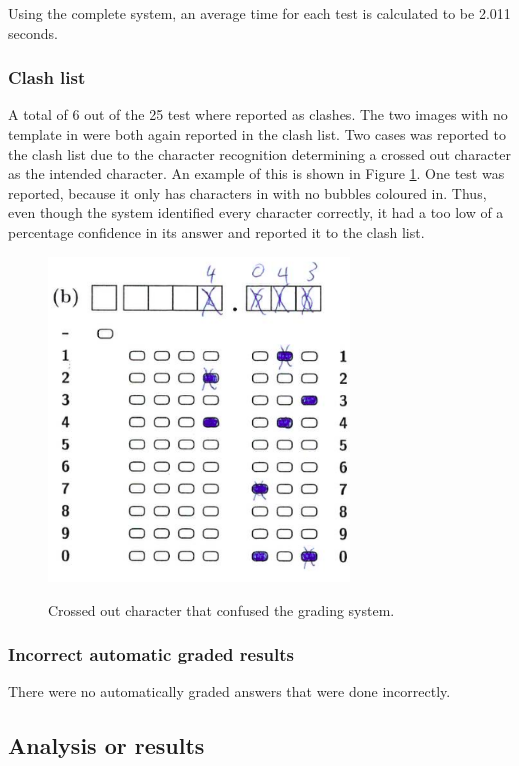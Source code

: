 Using the complete system, an average time for each test is calculated to be 2.011 seconds. 

\subsubsection{Clash list}

A total of 6 out of the 25 test where reported as clashes. The two images with no template in were both again reported in the clash list. Two cases was reported to the clash list due to the character recognition determining a crossed out character as the intended character. An example of this is shown in Figure \ref{fig:crossedOutCharacter}. One test was reported, because it only has characters in with no bubbles coloured in. Thus, even though the system identified every character correctly, it had a too low of a percentage confidence in its answer and reported it to the clash list. 

\begin{figure}
  \centering
  \includegraphics[width=8cm]{crossedOutCharacter}\\
  \caption{Crossed out character that confused the grading system.}
  \label{fig:crossedOutCharacter}
\end{figure}

\subsubsection{Incorrect automatic graded results}

There were no automatically graded answers that were done incorrectly.

\subsection{Analysis or results}

